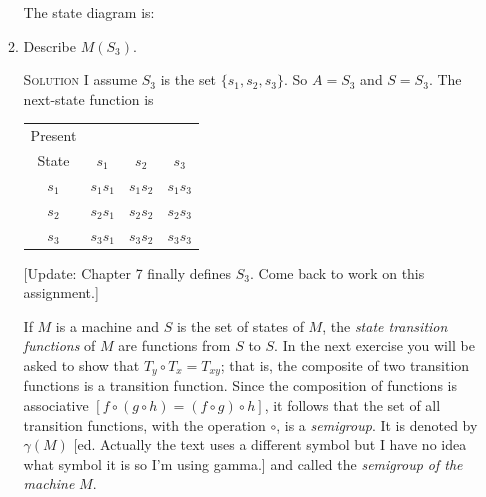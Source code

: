 \documentclass[twoside]{amsart}
\newcommand{\solution}{\textsc{Solution}\xspace}
\begin{document}
\begin{enumerate}[A.]
\begin{enumerate}[1]
      The state diagram is:
      \begin{center}
      \end{center}

      \item Describe $M(S_3)$.

      \noindent \solution I assume $S_3$ is the set $\{s_1,s_2,s_3\}$.
      So $A = S_3$ and $S=S_3$. The next-state function is

      \begin{center}
      \begin{tabular}{c|ccc}
          Present \\
	  State &  $s_1$    &  $s_2$   &  $s_3$ \\ \hline
	 $s_1$  &  $s_1s_1$ & $s_1s_2$ & $s_1s_3$ \\
	 $s_2$  &  $s_2s_1$ & $s_2s_2$ & $s_2s_3$ \\
	 $s_3$  &  $s_3s_1$ & $s_3s_2$ & $s_3s_3$
      \end{tabular}
      \end{center}

      [Update: Chapter 7 finally defines $S_3$. Come back to work on 
      this assignment.]

      \vspace{10pt}
      \hspace{.25in} If $M$ is a machine and $S$ is the set of states of $M$,
      the \emph{state transition functions} of $M$ are functions
      from $S$ to $S$. In the next exercise you will be asked to show
      that $T_y \circ T_x = T_{xy}$; that is, the composite of 
      two transition functions is a transition function. Since the
      composition of functions is associative $[f \circ (g \circ h) =
      (f \circ g) \circ h]$, it follows that the set of all transition
      functions, with the operation $\circ$, is a \emph{semigroup}.
      It is denoted by $\gamma(M)$ [ed. Actually the text uses a
      different symbol but I have no idea what symbol it is so I'm
      using gamma.] and called the \emph{semigroup of the machine} $M$.


\end{enumerate}
\end{enumerate}
\end{document}
